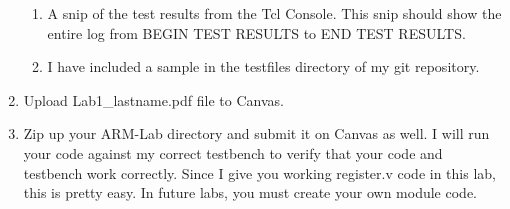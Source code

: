 \begin{enumerate}
\begin{enumerate}
		\item A snip of the test results from the Tcl Console.  This snip should show the entire log from BEGIN TEST RESULTS to END TEST RESULTS.
		\item I have included a sample in the testfiles directory of my git repository. 
	\end{enumerate}
\item Upload Lab1\_lastname.pdf file to Canvas.
\item Zip up your ARM-Lab directory and submit it on Canvas as well.  I will run your code against my correct testbench to verify that your code and testbench work correctly.  Since I give you working register.v code in this lab, this is pretty easy.  In future labs, you must create your own module code.
\end{enumerate} 
